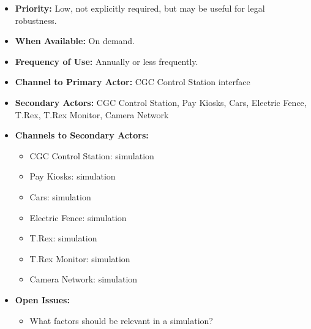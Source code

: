 \documentclass[12pt]{article}
\begin{document}
\begin{itemize}
        \item[]\textbf{Priority:}
            Low, not explicitly required, but may be useful for legal robustness.

        \item[]\textbf{When Available:}
            On demand.

        \item[]\textbf{Frequency of Use:}
            Annually or less frequently.

        \item[]\textbf{Channel to Primary Actor:}
            CGC Control Station interface

        \item[]\textbf{Secondary Actors:}
            CGC Control Station, Pay Kiosks, Cars, Electric Fence, T.Rex, 
            T.Rex Monitor, Camera Network
            
        \item[]\textbf{Channels to Secondary Actors:}
            \begin{itemize}
                \item[] CGC Control Station: simulation
                \item[] Pay Kiosks: simulation
                \item[] Cars: simulation
                \item[] Electric Fence: simulation
                \item[] T.Rex: simulation
                \item[] T.Rex Monitor: simulation
                \item[] Camera Network: simulation
            \end{itemize}

        \item[]\textbf{Open Issues:}
            \begin{itemize}
                \item[] What factors should be relevant in a simulation?
            \end{itemize}
    \end{itemize}
    
\end{document}
